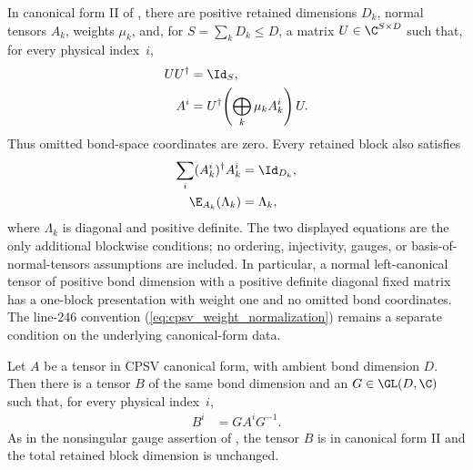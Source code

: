\begin{definition}\label{def:cpsv_cfii}
    \leanok
    In canonical form II of \cite[Appendix~A]{Cirac2016MPDO_arXiv}, there are
    positive retained dimensions $D_k$, normal tensors $A_k$, weights $\mu_k$,
    and, for $S=\sum_kD_k\le D$, a matrix $U\in\C^{S\times D}$ such
    that, for every physical index~$i$,
    \begin{align}
        UU^\dagger
         & =\Id_S,
        \notag                                              \\
        A^i
         & =U^\dagger\!\left(\bigoplus_k\mu_kA_k^i\right)U.
        \label{eq:cpsv_cfii_ambient}
    \end{align}
    Thus omitted bond-space coordinates are zero. Every retained
    block also satisfies
    \begin{align}
        \sum_i(A_k^i)^\dagger A_k^i
         & =\Id_{D_k},
        \notag         \\
        \E_{A_k}(\Lambda_k)
         & =\Lambda_k,
        \notag
    \end{align}
    where $\Lambda_k$ is diagonal and positive definite. The two displayed
    equations are the only additional blockwise conditions; no ordering,
    injectivity, gauges, or basis-of-normal-tensors assumptions are included.
    In particular, a normal left-canonical tensor of positive bond dimension
    with a positive definite diagonal fixed matrix has a one-block
    presentation with weight one and no omitted bond coordinates.
    The line-246 convention
    (\ref{eq:cpsv_weight_normalization}) remains a separate condition on the
    underlying canonical-form data.
\end{definition}

\begin{lemma}
    \label{thm:cpsv_cf_to_cfii_gauge}
    \leanok
    Let $A$ be a tensor in CPSV canonical form, with ambient bond dimension
    $D$. Then there is a tensor $B$ of the same bond dimension and an
    $G\in\GL(D,\C)$ such that, for every physical index~$i$,
    \begin{align}
        B^i
         & =G A^iG^{-1}.
    \end{align}
    As in the nonsingular gauge assertion of
    \cite[Appendix~A]{Cirac2016MPDO_arXiv}, the tensor $B$ is in canonical
    form II and the total retained block dimension is unchanged.
\end{lemma}

